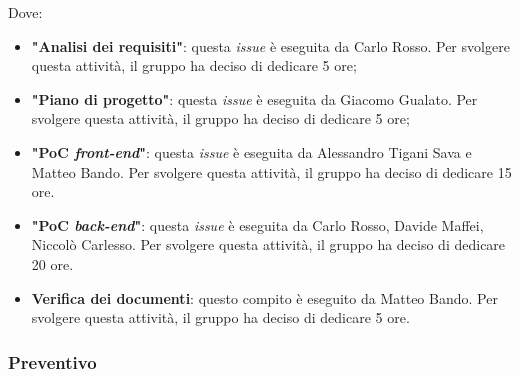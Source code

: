 Dove:
\begin{itemize}
	\item \textbf{"Analisi dei requisiti"}: questa \textit{issue} è eseguita da
	      Carlo Rosso. Per svolgere questa attività, il gruppo ha deciso di
	      dedicare 5 ore;

	\item \textbf{"Piano di progetto"}: questa \textit{issue} è eseguita da
	      Giacomo Gualato. Per svolgere questa attività, il gruppo ha deciso
	      di dedicare 5 ore;

	\item \textbf{"PoC \textit{front-end}"}: questa \textit{issue} è eseguita
	      da Alessandro Tigani Sava e Matteo Bando. Per svolgere questa
	      attività, il gruppo ha deciso di dedicare 15 ore.

	\item \textbf{"PoC \textit{back-end}"}: questa \textit{issue} è eseguita
	      da Carlo Rosso, Davide Maffei, Niccolò Carlesso. Per svolgere questa
	      attività, il gruppo ha deciso di dedicare 20 ore.

	\item \textbf{Verifica dei documenti}: questo compito è eseguito da
	      Matteo Bando. Per svolgere questa attività, il gruppo ha deciso
	      di dedicare 5 ore.
\end{itemize}

\subsubsection{Preventivo}

